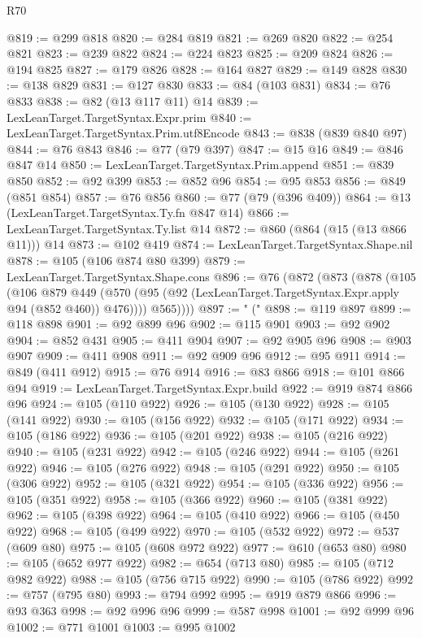 \begin{lexlean}{R70}
\begin{coremodule}
@819 := @299 @818
@820 := @284 @819
@821 := @269 @820
@822 := @254 @821
@823 := @239 @822
@824 := @224 @823
@825 := @209 @824
@826 := @194 @825
@827 := @179 @826
@828 := @164 @827
@829 := @149 @828
@830 := @138 @829
@831 := @127 @830
@833 := @84 (@103 @831)
@834 := @76 @833
@838 := @82 (@13 @117 @11) @14
@839 := LexLeanTarget.TargetSyntax.Expr.prim
@840 := LexLeanTarget.TargetSyntax.Prim.utf8Encode
@843 := @838 (@839 @840 @97)
@844 := @76 @843
@846 := @77 (@79 @397)
@847 := @15 @16
@849 := @846 @847 @14
@850 := LexLeanTarget.TargetSyntax.Prim.append
@851 := @839 @850
@852 := @92 @399
@853 := @852 @96
@854 := @95 @853
@856 := @849 (@851 @854)
@857 := @76 @856
@860 := @77 (@79 (@396 @409))
@864 := @13 (LexLeanTarget.TargetSyntax.Ty.fn @847 @14)
@866 := LexLeanTarget.TargetSyntax.Ty.list @14
@872 := @860 (@864 (@15 (@13 @866 @11))) @14
@873 := @102 @419
@874 := LexLeanTarget.TargetSyntax.Shape.nil
@878 := @105 (@106 @874 @80 @399)
@879 := LexLeanTarget.TargetSyntax.Shape.cons
@896 := @76
    (@872
      (@873
        (@878
          (@105
            (@106
              @879
              @449
              (@570 (@95 (@92 (LexLeanTarget.TargetSyntax.Expr.apply @94 (@852 @460)) @476))))
            @565))))
@897 := " ("
@898 := @119 @897
@899 := @118 @898
@901 := @92 @899 @96
@902 := @115 @901
@903 := @92 @902
@904 := @852 @431
@905 := @411 @904
@907 := @92 @905 @96
@908 := @903 @907
@909 := @411 @908
@911 := @92 @909 @96
@912 := @95 @911
@914 := @849 (@411 @912)
@915 := @76 @914
@916 := @83 @866
@918 := @101 @866 @94
@919 := LexLeanTarget.TargetSyntax.Expr.build
@922 := @919 @874 @866 @96
@924 := @105 (@110 @922)
@926 := @105 (@130 @922)
@928 := @105 (@141 @922)
@930 := @105 (@156 @922)
@932 := @105 (@171 @922)
@934 := @105 (@186 @922)
@936 := @105 (@201 @922)
@938 := @105 (@216 @922)
@940 := @105 (@231 @922)
@942 := @105 (@246 @922)
@944 := @105 (@261 @922)
@946 := @105 (@276 @922)
@948 := @105 (@291 @922)
@950 := @105 (@306 @922)
@952 := @105 (@321 @922)
@954 := @105 (@336 @922)
@956 := @105 (@351 @922)
@958 := @105 (@366 @922)
@960 := @105 (@381 @922)
@962 := @105 (@398 @922)
@964 := @105 (@410 @922)
@966 := @105 (@450 @922)
@968 := @105 (@499 @922)
@970 := @105 (@532 @922)
@972 := @537 (@609 @80)
@975 := @105 (@608 @972 @922)
@977 := @610 (@653 @80)
@980 := @105 (@652 @977 @922)
@982 := @654 (@713 @80)
@985 := @105 (@712 @982 @922)
@988 := @105 (@756 @715 @922)
@990 := @105 (@786 @922)
@992 := @757 (@795 @80)
@993 := @794 @992
@995 := @919 @879 @866
@996 := @93 @363
@998 := @92 @996 @96
@999 := @587 @998
@1001 := @92 @999 @96
@1002 := @771 @1001
@1003 := @995 @1002

\end{coremodule}
\end{lexlean}
